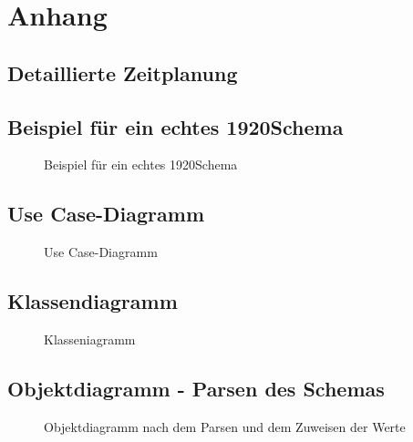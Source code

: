 \section{Anhang}
\subsection{Detaillierte Zeitplanung}
\label{app:Zeitplanung}


\clearpage
\subsection{Beispiel für ein echtes 1920Schema}
\label{app:RealSchema}
\begin{figure}[htb]
\centering
{}
\caption{Beispiel für ein echtes 1920Schema}
\end{figure}
\clearpage

\subsection{Use Case-Diagramm}
\label{app:UseCase}
\begin{figure}[htb]
\centering
{}
\caption{Use Case-Diagramm}
\end{figure}
\clearpage


\clearpage

\subsection{Klassendiagramm}
\label{app:classd}
\begin{figure}[htb]
\centering
{}
\caption{Klasseniagramm}
\end{figure}
\clearpage


\subsection{Objektdiagramm - Parsen des Schemas}
\label{app:ObjDiagramsdiagrammSchemaParsen}
\begin{figure}[htb]
\centering
{}
\caption{Objektdiagramm nach dem Parsen und dem Zuweisen der Werte}
\end{figure}
\clearpage

